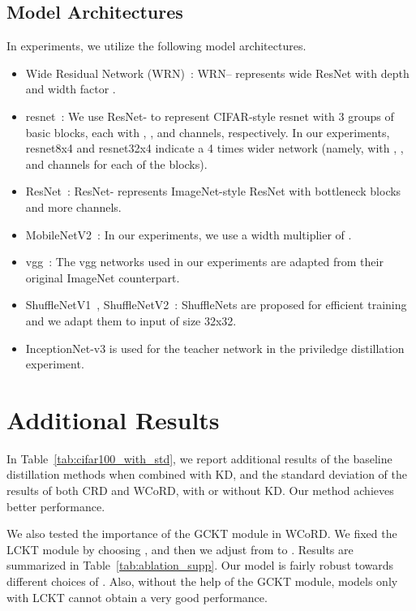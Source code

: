 \documentclass[final]{cvpr}
\theoremstyle{definition}
\begin{document}
\subsection{Model Architectures}
In experiments, we utilize the following model architectures.
\begin{itemize}
	\item Wide Residual Network (WRN)~\cite{zagoruyko2016wide}: WRN-- represents wide ResNet with depth  and width factor .
	\item resnet~\cite{he2016deep}: We use ResNet- to represent CIFAR-style resnet with 3 groups of basic blocks, each with , , and  channels, respectively. In our experiments, resnet8x4 and resnet32x4 indicate a 4 times wider network (namely, with , , and  channels for each of the blocks).
\item ResNet~\cite{he2016deep}: ResNet- represents ImageNet-style ResNet with bottleneck blocks and more channels. \item MobileNetV2~\cite{sandler2018mobilenetv2}: In our experiments, we use a width multiplier of .
	\item vgg~\cite{simonyan2014very}: The vgg networks used in our experiments are adapted from their original ImageNet counterpart.
	\item ShuffleNetV1~\cite{zhang2018shufflenet}, ShuffleNetV2~\cite{tan2019mnasnet}: ShuffleNets are proposed for efficient training and we adapt them to input of size 32x32.
	\item InceptionNet-v3 \cite{szegedy2016rethinking} is used for the teacher network in the priviledge distillation experiment.
\end{itemize}

\section{Additional Results}
In Table~\ref{tab:cifar100_with_std}, we report additional results of the baseline distillation methods when combined with KD, and the standard deviation of the results of both CRD and WCoRD, with or without KD. Our method achieves better performance.

We also tested the importance of the GCKT module in WCoRD. We fixed the LCKT module by choosing , and then we adjust  from  to . Results are summarized in Table~\ref{tab:ablation_supp}.
Our model is fairly robust towards different choices of . Also, without the help of the GCKT module, models only with LCKT cannot obtain a very good performance.
\end{document}
